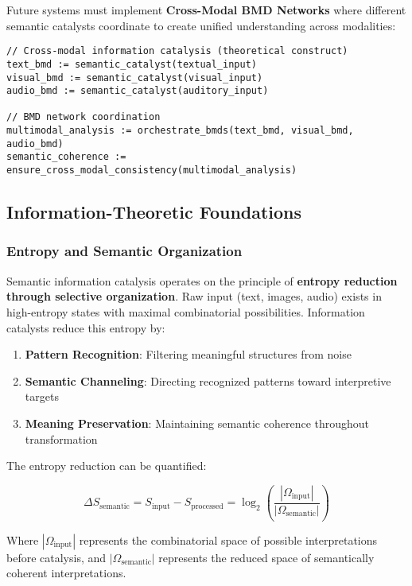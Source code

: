 \documentclass[12pt,a4paper,twoside]{article}
\begin{document}
Future systems must implement \textbf{Cross-Modal BMD Networks} where different semantic catalysts coordinate to create unified understanding across modalities:

\begin{lstlisting}[caption=Theoretical Cross-Modal Information Catalysis]
// Cross-modal information catalysis (theoretical construct)
text_bmd := semantic_catalyst(textual_input)
visual_bmd := semantic_catalyst(visual_input)
audio_bmd := semantic_catalyst(auditory_input)

// BMD network coordination
multimodal_analysis := orchestrate_bmds(text_bmd, visual_bmd, audio_bmd)
semantic_coherence := ensure_cross_modal_consistency(multimodal_analysis)
\end{lstlisting}

\subsection{Information-Theoretic Foundations}

\subsubsection{Entropy and Semantic Organization}

Semantic information catalysis operates on the principle of \textbf{entropy reduction through selective organization}. Raw input (text, images, audio) exists in high-entropy states with maximal combinatorial possibilities. Information catalysts reduce this entropy by:

\begin{enumerate}
\item \textbf{Pattern Recognition}: Filtering meaningful structures from noise
\item \textbf{Semantic Channeling}: Directing recognized patterns toward interpretive targets
\item \textbf{Meaning Preservation}: Maintaining semantic coherence throughout transformation
\end{enumerate}

The entropy reduction can be quantified:

\begin{equation}
\Delta S_{\text{semantic}} = S_{\text{input}} - S_{\text{processed}} = \log_2\left(\frac{|\Omega_{\text{input}}|}{|\Omega_{\text{semantic}}|}\right)
\end{equation}

Where $|\Omega_{\text{input}}|$ represents the combinatorial space of possible interpretations before catalysis, and $|\Omega_{\text{semantic}}|$ represents the reduced space of semantically coherent interpretations.
\end{document}
